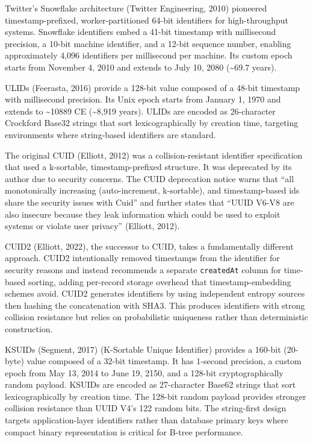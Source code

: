 \documentclass[fleqn,10pt]{wlpeerj}
\begin{document}
Twitter's Snowflake architecture (Twitter Engineering, 2010) pioneered
timestamp-prefixed, worker-partitioned 64-bit identifiers for
high-throughput systems. Snowflake identifiers embed a 41-bit timestamp
with millisecond precision, a 10-bit machine identifier, and a 12-bit
sequence number, enabling approximately 4,096 identifiers per
millisecond per machine. Its custom epoch starts from November 4, 2010
and extends to July 10, 2080 (\textasciitilde69.7 years).

ULIDs (Feerasta, 2016) provide a 128-bit value composed of a 48-bit
timestamp with millisecond precision. Its Unix epoch starts from January
1, 1970 and extends to \textasciitilde10889 CE (\textasciitilde8,919
years). ULIDs are encoded as 26-character Crockford Base32 strings that
sort lexicographically by creation time, targeting environments where
string-based identifiers are standard.

The original CUID (Elliott, 2012) was a collision-resistant identifier
specification that used a k-sortable, timestamp-prefixed structure. It
was deprecated by its author due to security concerns. The CUID
deprecation notice warns that ``all monotonically increasing
(auto-increment, k-sortable), and timestamp-based ids share the security
issues with Cuid'' and further states that ``UUID V6-V8 are also
insecure because they leak information which could be used to exploit
systems or violate user privacy'' (Elliott, 2012).

CUID2 (Elliott, 2022), the successor to CUID, takes a fundamentally
different approach. CUID2 intentionally removed timestamps from the
identifier for security reasons and instead recommends a separate
\texttt{createdAt} column for time-based sorting, adding per-record
storage overhead that timestamp-embedding schemes avoid. CUID2 generates
identifiers by using independent entropy sources then hashing the
concatenation with SHA3. This produces identifiers with strong collision
resistance but relies on probabilistic uniqueness rather than
deterministic construction.

KSUIDs (Segment, 2017) (K-Sortable Unique Identifier) provides a 160-bit
(20-byte) value composed of a 32-bit timestamp. It has 1-second
precision, a custom epoch from May 13, 2014 to June 19, 2150, and a
128-bit cryptographically random payload. KSUIDs are encoded as
27-character Base62 strings that sort lexicographically by creation
time. The 128-bit random payload provides stronger collision resistance
than UUID V4's 122 random bits. The string-first design targets
application-layer identifiers rather than database primary keys where
compact binary representation is critical for B-tree performance.
\end{document}
